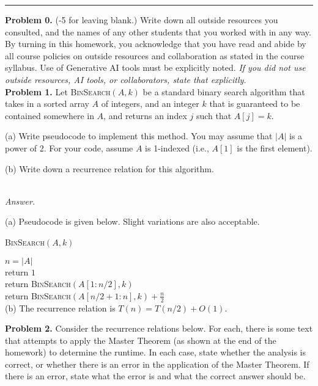 \documentclass[12pt]{article}  %
\begin{document}
\rule{\textwidth}{0.4pt}

\textbf{Problem 0.} (-5 for leaving blank.) Write down all outside resources you consulted, and the names of any other students that you worked with in any way. By turning in this homework, you acknowledge that you have read and abide by all course policies on outside resources and collaboration as stated in the course syllabus. Use of Generative AI tools must be explicitly noted. \textit{If you did not use outside resources, AI tools, or collaborators, state that explicitly.}\\

\textbf{Problem 1.} Let \textsc{BinSearch}$(A,k)$ be a standard binary search algorithm that takes in a {sorted} array $A$ of integers, and an integer $k$ that is guaranteed to be contained somewhere in $A$, and returns an index $j$ such that $A[j] = k$. 

(a) Write pseudocode to implement this method. You may assume that $|A|$ is a power of 2. For your code, assume $A$ is 1-indexed (i.e., $A[1]$ is the first element).

(b) Write down a recurrence relation for this algorithm.

~\\ 

\textit{Answer.}

(a) Pseudocode is given below. Slight variations are also acceptable. 

\textsc{BinSearch}$(A,k)$

\State $n = |A|$\\
\ind \State return $1$\\
\ind \State return \textsc{BinSearch}$(A[1:n/2],k)$\\
\Else
\ind \State return \textsc{BinSearch}$(A[n/2+1:n],k) + \frac{n}{2}$\\


(b) The recurrence relation is $T(n) = T(n/2) + O(1)$. 


\textbf{Problem 2.} Consider the recurrence relations below. For each, there is some text that attempts to apply the Master Theorem (as shown at the end of the homework) to determine the runtime. In each case, state whether the analysis is correct, or whether there is an error in the application of the Master Theorem. If there is an error, state what the error is and what the correct answer should be.
\end{document}
